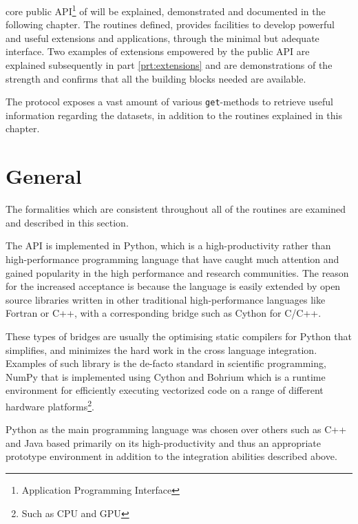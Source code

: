  core public API\footnote{Application Programming Interface} of \CodeName will be explained, demonstrated and documented in the following chapter. The routines defined, provides facilities to develop powerful and useful extensions and applications, through the minimal but adequate interface. Two examples of extensions empowered by the public \CodeName API are explained subsequently in part \ref{prt:extensions} and are demonstrations of the strength and confirms that all the building blocks needed are available.
\newline

The protocol exposes a vast amount of various \texttt{get}-methods to retrieve useful information regarding the datasets, in addition to the routines explained in this chapter.

\section{General} \label{sec:general}
The formalities which are consistent throughout all of the routines are examined and described in this section.

The API is implemented in Python\cite{PagePython}, which is a high-productivity rather than high-performance programming language that have caught much attention and gained popularity in the high performance and research communities. The reason for the increased acceptance is because the language is easily extended by open source libraries written in other traditional high-performance languages like Fortran or C++, with a corresponding bridge such as Cython\cite{PageCPython} for C/C++. 
\newline

These types of bridges are usually the optimising static compilers for Python that simplifies, and minimizes the hard work in the cross language integration. Examples of such library is the de-facto standard in scientific programming, NumPy \cite{PageNumpy} \cite{oliphant2006guide} that is implemented using Cython and Bohrium \cite{PageBohrium} \cite{kristensen2013bohrium} which is a runtime environment for efficiently executing vectorized code on a range of different hardware platforms\footnote{Such as CPU and GPU}.
\newline

Python as the main programming language was chosen over others such as C++ and Java based primarily on its high-productivity and thus an appropriate prototype environment in addition to the integration abilities described above.
\newline

